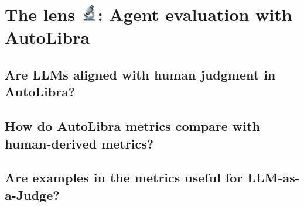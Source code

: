 \section{The lens \protect\includegraphics[height=1em]{figs/microscope.png}: Agent evaluation with AutoLibra}
\label{sec:lens}

\subsection{Are LLMs aligned with human judgment in AutoLibra?}

\subsection{How do AutoLibra metrics compare with human-derived metrics?}

\subsection{Are examples in the metrics useful for LLM-as-a-Judge?}

